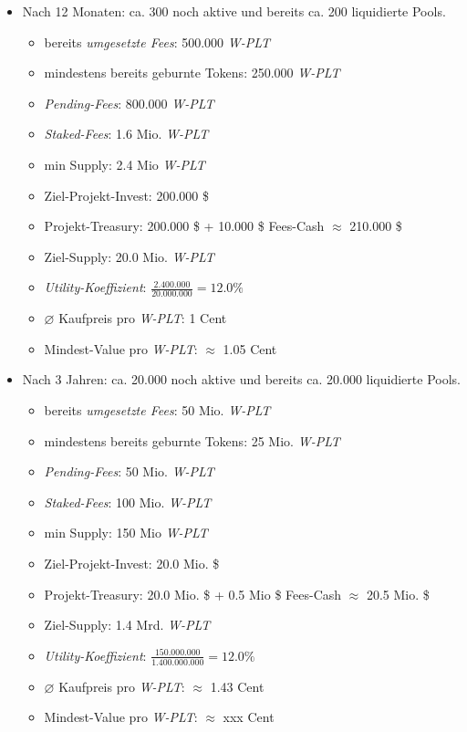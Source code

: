 \begin{Example}
\begin{itemize}
\begin{itemize}
	\end{itemize}
	\item Nach 12 Monaten: ca. 300 noch aktive und bereits ca. 200 liquidierte Pools.
	\begin{itemize}
		\item bereits \textit{umgesetzte Fees}: 500.000 \textit{W-PLT}  
		\item mindestens bereits geburnte Tokens: 250.000 \textit{W-PLT}
		\item \textit{Pending-Fees}: 800.000 \textit{W-PLT}  
		\item \textit{Staked-Fees}: 1.6 Mio. \textit{W-PLT} 
		\item min Supply: 2.4 Mio \textit{W-PLT} 
		\item Ziel-Projekt-Invest: 200.000 \$
		\item Projekt-Treasury: 200.000 \$ + 10.000 \$ Fees-Cash $\approx$ 210.000 \$
		\item Ziel-Supply: 20.0 Mio. \textit{W-PLT}
		\item \textit{Utility-Koeffizient}: $\frac{2.400.000}{20.000.000} = 12.0 \%$
		\item $\varnothing$ Kaufpreis pro \textit{W-PLT}: 1 Cent
		\item Mindest-Value pro \textit{W-PLT}: $\approx$ 1.05 Cent
	\end{itemize}
	\item Nach 3 Jahren: ca. 20.000 noch aktive und bereits ca. 20.000 liquidierte Pools.
	\begin{itemize}
		\item bereits \textit{umgesetzte Fees}: 50 Mio. \textit{W-PLT}  
		\item mindestens bereits geburnte Tokens: 25 Mio. \textit{W-PLT}
		\item \textit{Pending-Fees}: 50 Mio. \textit{W-PLT}  
		\item \textit{Staked-Fees}: 100 Mio. \textit{W-PLT} 
		\item min Supply: 150 Mio \textit{W-PLT} 
		\item Ziel-Projekt-Invest: 20.0 Mio. \$
		\item Projekt-Treasury: 20.0 Mio. \$ + 0.5 Mio \$ Fees-Cash $\approx$ 20.5 Mio. \$
		\item Ziel-Supply: 1.4 Mrd. \textit{W-PLT}
		\item \textit{Utility-Koeffizient}: $\frac{150.000.000}{1.400.000.000} = 12.0 \%$
		\item $\varnothing$ Kaufpreis pro \textit{W-PLT}: $\approx$ 1.43 Cent
		\item Mindest-Value pro \textit{W-PLT}: $\approx$ xxx Cent

\end{itemize}
\end{itemize}
\end{Example}
